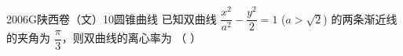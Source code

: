 
\begin{problem}{2006}{G}{陕西卷（文）}{10}{圆锥曲线}
已知双曲线 $ \dfrac{x^2}{a^2} - \dfrac{y^2}{2} = 1 $ ($ a > \sqrt{2} $) 的两条渐近线的夹角为 $ \dfrac{\pi}{3} $，则双曲线的离心率为 （ ）
\begin{choices}
\end{choices}
\end{problem}

\begin{answer}

\end{answer}

\begin{solutions}

\end{solutions}